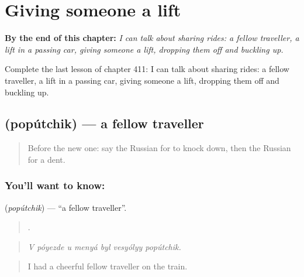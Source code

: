 
\chapter{Giving someone a lift}
\label{ch:ru-giving-someone-a-lift}

\begin{chapteropening}
\textbf{By the end of this chapter:} \emph{I can talk about sharing rides: a fellow traveller, a lift in a passing car, giving someone a lift, dropping them off and buckling up.}

Complete the last lesson of chapter 411: I can talk about sharing rides: a fellow traveller, a lift in a passing car, giving someone a lift, dropping them off and buckling up.
\end{chapteropening}

\section[\texorpdfstring{\ru{попутчик} (popútchik)}{попутчик (popútchik)}]{ (popútchik) — a fellow traveller}

\label{lesson:RU-C411-poputchik}



\begin{quote}
Before the new one: say the Russian for to knock down, then the Russian for a dent.
\end{quote}

\subsection*{You'll want to know: }
\textbf{} (\emph{popútchik}) — \textquotedblleft{}a fellow traveller\textquotedblright{}.

\begin{quote}
      .
\end{quote}

\begin{quote}
\emph{V póyezde u menyá byl vesyólyy popútchik.}
\end{quote}

\begin{quote}
I had a cheerful fellow traveller on the train.
\end{quote}

